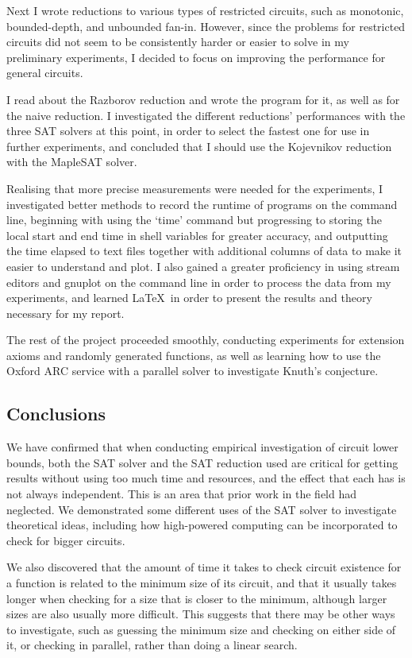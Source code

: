 \documentclass{article}
\begin{document}
Next I wrote reductions to various types of restricted circuits, such as monotonic, bounded-depth, and unbounded fan-in. However, since the problems for restricted circuits did not seem to be consistently harder or easier to solve in my preliminary experiments, I decided to focus on improving the performance for general circuits.

I read about the Razborov reduction and wrote the program for it, as well as for the naive reduction. I investigated the different reductions' performances with the three SAT solvers at this point, in order to select the fastest one for use in further experiments, and concluded that I should use the Kojevnikov reduction with the MapleSAT solver.

Realising that more precise measurements were needed for the experiments, I investigated better methods to record the runtime of programs on the command line, beginning with using the `time' command but progressing to storing the local start and end time in shell variables for greater accuracy, and outputting the time elapsed to text files together with additional columns of data to make it easier to understand and plot. I also gained a greater proficiency in using stream editors and gnuplot on the command line in order to process the data from my experiments, and learned \LaTeX  \ in order to present the results and theory necessary for my report.

The rest of the project proceeded smoothly, conducting experiments for extension axioms and randomly generated functions, as well as learning how to use the Oxford ARC service with a parallel solver to investigate Knuth's conjecture. 

\subsection{Conclusions}

We have confirmed that when conducting empirical investigation of circuit lower bounds, both the SAT solver and the SAT reduction used are critical for getting results without using too much time and resources, and the effect that each has is not always independent. This is an area that prior work in the field had neglected. We demonstrated some different uses of the SAT solver to investigate theoretical ideas, including how high-powered computing can be incorporated to check for bigger circuits. 

We also discovered that the amount of time it takes to check circuit existence for a function is related to the minimum size of its circuit, and that it usually takes longer when checking for a size that is closer to the minimum, although larger sizes are also usually more difficult. This suggests that there may be other ways to investigate, such as guessing the minimum size and checking on either side of it, or checking in parallel, rather than doing a linear search.
\end{document}
